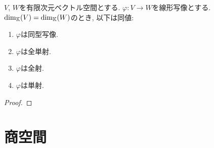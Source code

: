 \begin{prop}
  $V$, $W$を有限次元ベクトル空間とする.
  $\varphi\colon V\to W$を線形写像とする.
  $\dim_{\mathbb{K}}(V)=\dim_{\mathbb{K}}(W)$のとき, 以下は同値:
  \begin{enumerate}
  \item $\varphi$は同型写像.
  \item $\varphi$は全単射.
  \item $\varphi$は全射.
  \item $\varphi$は単射.
  \end{enumerate}
\end{prop}
\begin{proof}\end{proof}





\begin{quiz}
\end{quiz}

\chapter{商空間}
\label{chap:quotient}
